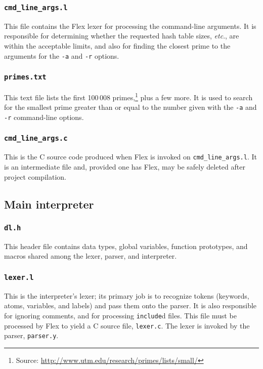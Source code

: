 \documentclass[a4paper,10pt,twocolumn]{article}
\begin{document}
\subsubsection{\texttt{cmd\_line\_args.l}}
  
This file contains the Flex lexer for processing the command-line
arguments. It is responsible for determining whether the requested
hash table sizes, \textit{etc}., are within the acceptable limits, and
also for finding the closest prime to the arguments for the
\texttt{-a} and \texttt{-r} options.

\subsubsection{\texttt{primes.txt}}
  
This text file lists the first 100\,008 primes,\footnote{Source:
  \url{http://www.utm.edu/research/primes/lists/small/}} plus a few
more. It is used to search for the smallest prime greater than or
equal to the number given with the \texttt{-a} and \texttt{-r}
command-line options.

\subsubsection{\texttt{cmd\_line\_args.c}}
  
This is the C source code produced when Flex is invoked on
\texttt{cmd\_line\_args.l}. It is an intermediate file and, provided
one has Flex, may be safely deleted after project compilation.

\subsection{Main interpreter}

\subsubsection{\texttt{dl.h}}
  
This header file contains data types, global variables, function
prototypes, and macros shared among the lexer, parser, and
interpreter.
  
\subsubsection{\texttt{lexer.l}}
  
This is the interpreter's lexer; its primary job is to recognize
tokens (keywords, atoms, variables, and labels) and pass them onto the
parser. It is also responsible for ignoring comments, and for
processing \texttt{include}d files. This file must be processed by
Flex to yield a C source file, \texttt{lexer.c}. The lexer is invoked
by the parser, \texttt{parser.y}.
  
\end{document}
